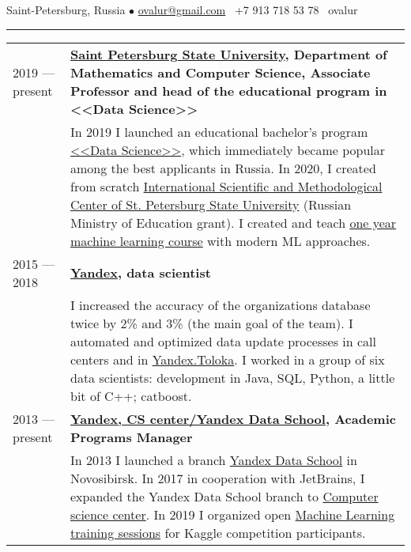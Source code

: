 \documentclass[11pt]{article}
\begin{document}
%

\vspace{0.5em}

\noindent Saint-Petersburg, Russia $\bullet$ \href{mailto:ovalur@gmail.com}{ovalur@gmail.com} \faMobile~+7 913 718 53 78 \faSendO~ovalur

\vspace{0.5em}
\hrule
\vspace{0.5em}

\begin{longtable} {l | p{}}

2019 — present & {\textbf{\href{https://spbu.ru}{Saint Petersburg State University}, Department of Mathematics and Computer Science, Associate Professor and head of the educational program in <<Data Science>>}} \\

& {In 2019 I launched an educational bachelor's program \href{https://maad.compscicenter.ru}{<<Data Science>>}, which immediately became popular among the best applicants in Russia. In 2020, I created from scratch \href{https://gsom.spbu.ru/all_news/event2021-02-04/}{International Scientific and Methodological Center of St. Petersburg State University} (Russian Ministry of Education grant). I created and teach \href{https://github.com/spbu-math-cs/ml-course/}{one year machine learning course} with modern ML approaches.} \\

2015 — 2018 & {\textbf{\href{https://yandex.ru/}{Yandex}, data scientist}} \\
& {I increased the accuracy of the organizations database twice by 2\% and 3\% (the main goal of the team). I automated and optimized data update processes in call centers and in \href{https://toloka.yandex.ru}{Yandex.Toloka}. I worked in a group of six data scientists: development in Java, SQL, Python, a little bit of C++; catboost.}\\

2013 — present & {\textbf{\href{https://compscicenter.ru}{Yandex, CS center/Yandex Data School}, Academic Programs Manager}} \\
& {In 2013 I launched a branch \href{https://yandexdataschool.ru}{Yandex Data School} in Novosibirsk. In 2017 in cooperation with JetBrains, I expanded the Yandex Data School branch to \href{https://compscicenter.ru}{Computer science center}. In 2019 I organized open \href{https://habr.com/ru/company/JetBrains-education/blog/458042/}{Machine Learning training sessions} for Kaggle competition participants.} \\


\end{longtable}
\end{document}
